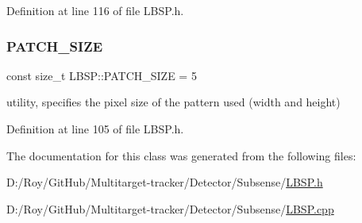 Definition at line 116 of file L\+B\+S\+P.\+h.

\mbox{\label{class_l_b_s_p_aa98abb79a155d3a2b416c2ab32e74929}} 
\subsubsection{\texorpdfstring{P\+A\+T\+C\+H\+\_\+\+S\+I\+ZE}{PATCH\_SIZE}}
{\footnotesize\ttfamily const size\+\_\+t L\+B\+S\+P\+::\+P\+A\+T\+C\+H\+\_\+\+S\+I\+ZE = 5\hspace{0.3cm}{\ttfamily [static]}}



utility, specifies the pixel size of the pattern used (width and height) 



Definition at line 105 of file L\+B\+S\+P.\+h.



The documentation for this class was generated from the following files\+:\begin{DoxyCompactItemize}
\item 
D\+:/\+Roy/\+Git\+Hub/\+Multitarget-\/tracker/\+Detector/\+Subsense/\mbox{\hyperlink{_l_b_s_p_8h}{L\+B\+S\+P.\+h}}\item 
D\+:/\+Roy/\+Git\+Hub/\+Multitarget-\/tracker/\+Detector/\+Subsense/\mbox{\hyperlink{_l_b_s_p_8cpp}{L\+B\+S\+P.\+cpp}}\end{DoxyCompactItemize}
